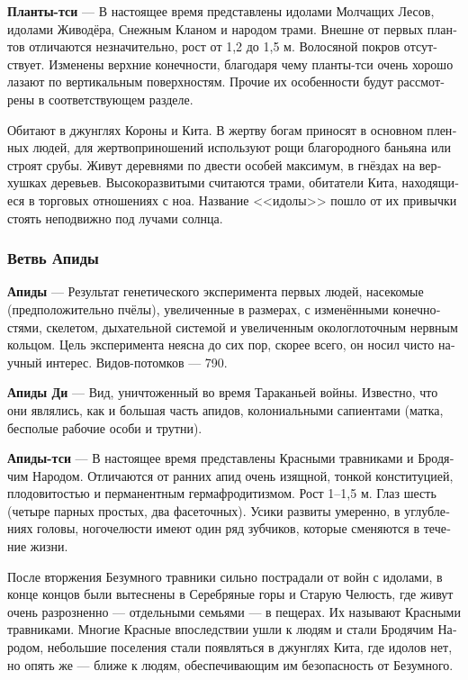 \documentclass[a4paper,12pt,fleqn]{book}\usepackage{cooltooltips}\usepackage{polyglossia}\setdefaultlanguage[babelshorthands=true]{russian}\setotherlanguage{english}\defaultfontfeatures{Ligatures=TeX,Mapping=tex-text} \usepackage{xcolor}\definecolor{lightgray}{HTML}{bbbbbb}\color{lightgray}\newcommand{\ml}[3]{\textenglish{\textcolor{black}{#3}}}
\newcommand{\asterism}{\vspace{1em}{\centering\Large\bfseries$\ast~\ast~\ast$\par}\vspace{1em}}
\newcommand{\theterm}[3]{\textbf{\hypertarget{#1}{#2}} --- #3}
\begin{document}
\theterm{qi-plants}
{Планты-тси}
{В настоящее время представлены идолами Молчащих Лесов, идолами Живодёра, Снежным Кланом и народом трами.
Внешне от первых плантов отличаются незначительно, рост от 1,2 до 1,5 м.
Волосяной покров отсутствует.
Изменены верхние конечности, благодаря чему планты-тси очень хорошо лазают по вертикальным поверхностям.
Прочие их особенности будут рассмотрены в соответствующем разделе.

Обитают в джунглях Короны и Кита.
В жертву богам приносят в основном пленных людей, для жертвоприношений используют рощи благородного баньяна или строят срубы.
Живут деревнями по двести особей максимум, в гнёздах на верхушках деревьев.
Высокоразвитыми считаются трами, обитатели Кита, находящиеся в торговых отношениях с ноа.
Название <<идолы>> пошло от их привычки стоять неподвижно под лучами солнца.}

\subsubsection{Ветвь Апиды}

\theterm{apis-fork}
{Апиды}
{Результат генетического эксперимента первых людей, насекомые (предположительно пчёлы), увеличенные в размерах, с изменёнными конечностями, скелетом, дыхательной системой и увеличенным окологлоточным нервным кольцом.
Цель эксперимента неясна до сих пор, скорее всего, он носил чисто научный интерес.
Видов-потомков --- 790.}

\asterism

\theterm{di-apis}
{Апиды Ди}
{Вид, уничтоженный во время Тараканьей войны.
Известно, что они являлись, как и большая часть апидов, колониальными сапиентами (матка, бесполые рабочие особи и трутни).}

\theterm{qi-apis}
{Апиды-тси}
{В настоящее время представлены Красными травниками и Бродячим Народом.
Отличаются от ранних апид очень изящной, тонкой конституцией, плодовитостью и перманентным гермафродитизмом.
Рост 1--1,5 м.
Глаз шесть (четыре парных простых, два фасеточных).
Усики развиты умеренно, в углублениях головы, ногочелюсти имеют один ряд зубчиков, которые сменяются в течение жизни.

После вторжения Безумного травники сильно пострадали от войн с идолами, в конце концов были вытеснены в Серебряные горы и Старую Челюсть, где живут очень разрозненно --- отдельными семьями --- в пещерах.
Их называют Красными травниками.
Многие Красные впоследствии ушли к людям и стали Бродячим Народом, небольшие поселения стали появляться в джунглях Кита, где идолов нет, но опять же --- ближе к людям, обеспечивающим им безопасность от Безумного.}
\end{document}
